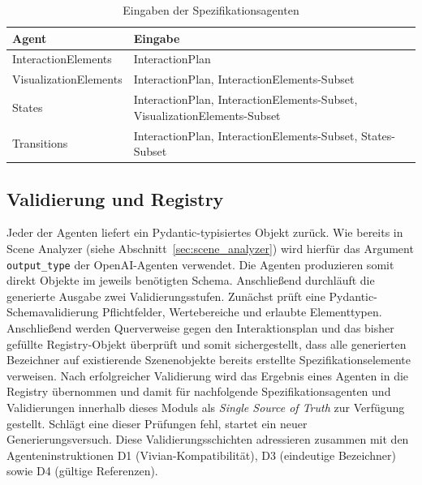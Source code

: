\begin{table}[htbp]
  \centering
  \begin{tabularx}{\linewidth}{l>{\raggedright\arraybackslash}X}
    \toprule
    Agent                 & Eingabe                                                                   \\
    \midrule
    InteractionElements   & InteractionPlan                                                           \\
    VisualizationElements & InteractionPlan, InteractionElements-Subset                               \\
    States                & InteractionPlan, InteractionElements-Subset, VisualizationElements-Subset \\
    Transitions           & InteractionPlan, InteractionElements-Subset, States-Subset                \\
    \bottomrule
  \end{tabularx}
  \caption{Eingaben der Spezifikationsagenten}\label{tab:spec_agents_dataflow}
\end{table}

\subsection*{Validierung und Registry}

Jeder der Agenten liefert ein Pydantic-typisiertes Objekt zurück. Wie bereits in Scene Analyzer (siehe Abschnitt~\ref{sec:scene_analyzer}) wird hierfür das Argument \texttt{output\_type} der OpenAI-Agenten verwendet. Die Agenten produzieren somit direkt Objekte im jeweils benötigten Schema. Anschließend durchläuft die generierte Ausgabe zwei Validierungsstufen. Zunächst prüft eine Pydantic-Schemavalidierung Pflichtfelder, Wertebereiche und erlaubte Elementtypen. Anschließend werden Querverweise gegen den Interaktionsplan und das bisher gefüllte Registry-Objekt überprüft und somit sichergestellt, dass alle generierten Bezeichner auf existierende Szenenobjekte \bzw bereits erstellte Spezifikationselemente verweisen.
Nach erfolgreicher Validierung wird das Ergebnis eines Agenten in die Registry übernommen und damit für nachfolgende Spezifikationsagenten und Validierungen innerhalb dieses Moduls als \textit{Single Source of Truth} zur Verfügung gestellt. Schlägt eine dieser Prüfungen fehl, startet ein neuer Generierungsversuch. Diese Validierungsschichten adressieren zusammen mit den Agenteninstruktionen D1 (Vivian-Kompatibilität), D3 (eindeutige Bezeichner) sowie D4 (gültige Referenzen).

